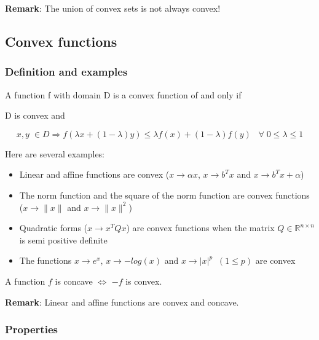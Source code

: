 \textbf{Remark}: The union of convex sets is not always convex!

\subsection{Convex functions}
\subsubsection{Definition and examples}
\begin{definition}
A function f with domain D is a convex function of and only if \\
\begin{center}
D is convex and 
\end{center}
$$x,y\; \in D \Rightarrow f(\lambda x+(1-\lambda)y) \le \lambda f(x)+(1-\lambda)f(y) \;\;\; \forall \; 0\le \lambda \le 1$$
\end{definition}
\vspace{0.5cm}
\begin{example}
\begin{leftbar}
Here are several examples:
\begin{itemize}
\item Linear and affine functions are convex ($x \rightarrow \alpha x$,  $x\rightarrow b^Tx$  and  $x \rightarrow b^Tx+\alpha$)
\item The norm function and the square of the norm function are convex functions ($x \rightarrow \|x\|$ and $x \rightarrow \|x\|^2$)
\item Quadratic forms ($x \rightarrow x^TQx$) are convex functions when the matrix $Q \in \mathbb{R}^{n\times n}$ is semi positive definite
\item The functions $x \rightarrow e^x$,  $x\rightarrow -log(x)$ and $x \rightarrow |x|^p \;\;(1 \le p)$ are convex
\end{itemize}
\end{leftbar}
\end{example}
\vspace{0.5cm}
\begin{definition}
A function $f$ is concave $\Leftrightarrow$ $-f$ is convex.
\end{definition}

\textbf{Remark}: Linear and affine functions are convex and concave.

\subsubsection{Properties}

